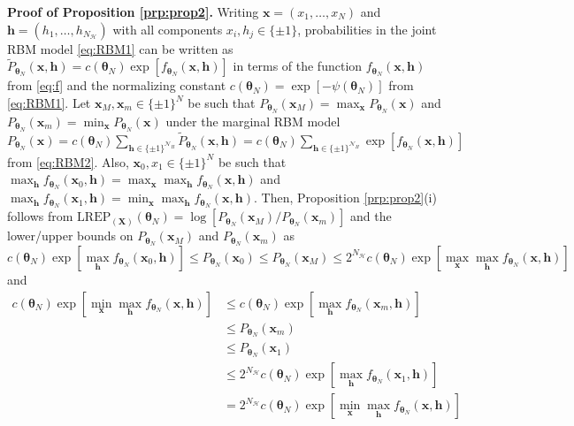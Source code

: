 \documentclass[numbib]{imamat}
\theoremstyle{theorem}
\theoremstyle{lemma}
\theoremstyle{example}
\theoremstyle{corollary}
\theoremstyle{definition}
\theoremstyle{remark}
\theoremstyle{approximation}
\theoremstyle{scheme}
\newcommand{\REP}{\mathrm{LREP}}
\begin{document}
\textbf{Proof of Proposition \ref{prp:prop2}.} Writing
\(\boldsymbol x=(x_1,\ldots,x_N)\) and
\(\boldsymbol h = (h_1,\ldots,h_{N_{\mathcal{H}}})\) with all components
\(x_i,h_j\in\{\pm 1\}\), probabilities in the joint RBM model
\eqref{eq:RBM1} can be written as
\(\tilde{P}_{\boldsymbol \theta_N} (\boldsymbol x, \boldsymbol h) = c(\boldsymbol \theta_N)\exp[ f_{\boldsymbol \theta_N} (\boldsymbol x, \boldsymbol h)]\)
in terms of the function
\(f_{\boldsymbol \theta_N} (\boldsymbol x, \boldsymbol h)\) from
\eqref{eq:f} and the normalizing constant
\(c(\boldsymbol \theta_N)= \exp [-\psi(\boldsymbol \theta_N)]\) from
\eqref{eq:RBM1}. Let \(\boldsymbol x_M, \boldsymbol x_m\in\{\pm 1\}^N\) be
such that
\(P_{\boldsymbol \theta_N} (\boldsymbol x_M) = \max_{\boldsymbol x}P_{\boldsymbol \theta_N} (\boldsymbol x)\)
and
\(P_{\boldsymbol \theta_N} (\boldsymbol x_m) = \min_{\boldsymbol x}P_{\boldsymbol \theta_N} (\boldsymbol x)\)
under the marginal RBM model
\(P_{\boldsymbol \theta_N} (\boldsymbol x) = c(\boldsymbol \theta_N)\sum_{\boldsymbol h \in\{\pm 1\}^{\mathcal{N}_H}} \tilde{P}_{\boldsymbol \theta_N} (\boldsymbol x, \boldsymbol h)= c(\boldsymbol \theta_N)\sum_{\boldsymbol h \in\{\pm 1\}^{\mathcal{N}_H}} \exp[ f_{\boldsymbol \theta_N} (\boldsymbol x, \boldsymbol h)]\)
from \eqref{eq:RBM2}. Also, \(\boldsymbol x_0,x_1\in\{\pm 1\}^N\) be such
that
\(\max_{\boldsymbol h}f_{\boldsymbol \theta_N} (\boldsymbol x_0, \boldsymbol h)=\max_{\boldsymbol x}\max_{\boldsymbol h}f_{\boldsymbol \theta_N} (\boldsymbol x , \boldsymbol h)\)
and
\(\max_{\boldsymbol h}f_{\boldsymbol \theta_N} (\boldsymbol x_1, \boldsymbol h)=\min_{\boldsymbol x}\max_{\boldsymbol h}f_{\boldsymbol \theta_N} (\boldsymbol x , \boldsymbol h)\).
Then, Proposition \ref{prp:prop2}(i) follows from
\(\REP_{(\boldsymbol X)}(\boldsymbol \theta_N) = \log[P_{\boldsymbol \theta_N} (\boldsymbol x_M) /P_{\boldsymbol \theta_N} (\boldsymbol x_m) ]\)
and the lower/upper bounds on
\(P_{\boldsymbol \theta_N} (\boldsymbol x_M)\) and
\(P_{\boldsymbol \theta_N} (\boldsymbol x_m)\) as \[
c(\boldsymbol \theta_N) \exp[\max_{\boldsymbol h}f_{\boldsymbol \theta_N} (\boldsymbol x_0 , \boldsymbol h)]
\leq P_{\boldsymbol \theta_N} (\boldsymbol x_0) \leq  P_{\boldsymbol \theta_N} (\boldsymbol x_M) \leq  2^{N_{\mathcal{H}}} c(\boldsymbol \theta_N) \exp[\max_{\boldsymbol x}\max_{\boldsymbol h}f_{\boldsymbol \theta_N} (\boldsymbol x, \boldsymbol h)]
\] and \begin{align*}
c(\boldsymbol \theta_N) \exp[\min_{\boldsymbol x}\max_{\boldsymbol h}f_{\boldsymbol \theta_N} (\boldsymbol x , \boldsymbol h)] &\leq c(\boldsymbol \theta_N) \exp[ \max_{\boldsymbol h}f_{\boldsymbol \theta_N} (\boldsymbol x_m , \boldsymbol h)] \\
&\leq P_{\boldsymbol \theta_N} (\boldsymbol x_m) \\
&\leq P_{\boldsymbol \theta_N} (\boldsymbol x_1) \\ 
&\leq 2^{N_{\mathcal{H}}} c(\boldsymbol \theta_N) \exp[ \max_{\boldsymbol h}f_{\boldsymbol \theta_N} (\boldsymbol x_1 , \boldsymbol h)]\\
&=2^{N_{\mathcal{H}}} c(\boldsymbol \theta_N) \exp[\min_{\boldsymbol x}\max_{\boldsymbol h}f_{\boldsymbol \theta_N} (\boldsymbol x , \boldsymbol h)]
\end{align*}
\end{document}
